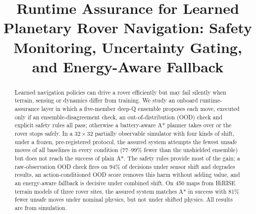 \documentclass[conference]{IEEEtran}
\begin{document}

\title{Runtime Assurance for Learned Planetary Rover Navigation: Safety Monitoring, Uncertainty Gating, and Energy-Aware Fallback}

\author{
\and
{}
\and
{}
}

\maketitle

\begin{abstract}
Learned navigation policies can drive a rover efficiently but may fail silently when terrain, sensing or dynamics differ
from training. We study an onboard runtime-assurance layer in which a five-member deep-Q ensemble proposes each move,
executed only if an ensemble-disagreement check, an out-of-distribution (OOD) check and explicit safety rules all pass;
otherwise a battery-aware A* planner takes over or the rover stops safely. In a $32\times32$ partially observable
simulator with four kinds of shift, under a frozen, pre-registered protocol, the assured system attempts the fewest unsafe
moves of all baselines in every condition (77--99\% fewer than the unshielded ensemble) but does not reach the success of
plain A*. The safety rules provide most of the gain; a
raw-observation OOD check fires on 94\% of decisions under sensor shift and degrades results, an action-conditioned OOD
score removes this harm without adding value, and an energy-aware fallback is decisive under combined shift. On 450 maps
from HiRISE terrain models of three rover sites, the assured system matches A* in success with 81\% fewer unsafe moves
under nominal physics, but not under shifted physics. All results are from simulation.
\end{abstract}
\end{document}
